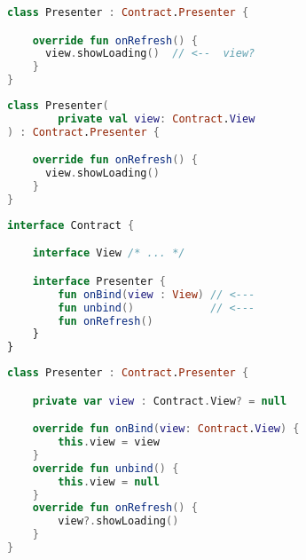 \documentclass[10pt]{beamer}
\begin{document}
\begin{frame}[fragile]
\begin{lstlisting}[language=Kotlin, basicstyle=\ttfamily]
class Presenter : Contract.Presenter {

    override fun onRefresh() {
      view.showLoading()  // <--  view?
    }
}

\end{lstlisting}
\end{frame}

\begin{frame}[fragile]
\begin{lstlisting}[language=Kotlin, basicstyle=\ttfamily]
class Presenter( 
        private val view: Contract.View
) : Contract.Presenter {

    override fun onRefresh() {
      view.showLoading()
    }
}
\end{lstlisting}
\end{frame}

\begin{frame}[fragile]
\begin{lstlisting}[language=Kotlin, basicstyle=\ttfamily]
interface Contract {

    interface View /* ... */

    interface Presenter {
        fun onBind(view : View) // <---
        fun unbind()            // <---
        fun onRefresh()
    }
}
\end{lstlisting}
\end{frame}

\begin{frame}[fragile]
\begin{lstlisting}[language=Kotlin, basicstyle=\ttfamily]
class Presenter : Contract.Presenter {

    private var view : Contract.View? = null

    override fun onBind(view: Contract.View) {
        this.view = view
    }
    override fun unbind() {
        this.view = null
    }
    override fun onRefresh() {
        view?.showLoading()
    }
}
\end{lstlisting}
\end{frame}


\begin{frame}[fragile]
\begin{lstlisting}[language=Kotlin, basicstyle=\ttfamily]
\end{lstlisting}
\end{frame}
\end{document}
